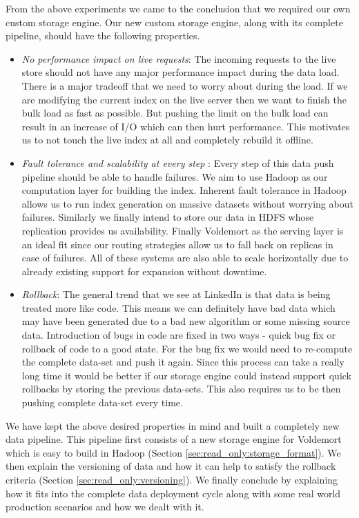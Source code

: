 \documentclass[10pt,twocolumn,preprint,natbib,authoryear]{sigplanconf}
\begin{document}
From the above experiments we came to the conclusion that we required our own custom storage engine. Our new custom storage engine, along with its complete pipeline, should have the following properties. 
\begin{itemize}
\item \emph {No performance impact on live requests}: The incoming requests to the live store should not have any major performance impact during the data load. There is a major tradeoff that we need to worry about during the load. If we are modifying the current index on the live server then we want to finish the bulk load as fast as possible. But pushing the limit on the bulk load can result in an increase of I/O which can then hurt performance. This motivates us to not touch the live index at all and completely rebuild it offline. 
\item \emph {Fault tolerance and scalability at every step }: Every step of this data push pipeline should be able to handle failures. We aim to use Hadoop as our computation layer for building the index. Inherent fault tolerance in Hadoop allows us to run index generation on massive datasets without worrying about failures. Similarly we finally intend to store our data in HDFS whose replication provides us availability. Finally Voldemort as the serving layer is an ideal fit since our routing strategies allow us to fall back on replicas in case of failures. All of these systems are also able to scale horizontally due to already existing support for expansion without downtime. 
\item \emph{Rollback}: The general trend that we see at LinkedIn is that data is being treated more like code. This means we can definitely have bad data which may have been generated due to a bad new algorithm or some missing source data. Introduction of bugs in code are fixed in two ways - quick bug fix or rollback of code to a good state. For the bug fix we would need to re-compute the complete data-set and push it again. Since this process can take a really long time it would be better if our storage engine could instead support quick rollbacks by storing the previous data-sets. This also requires us to be then pushing complete data-set every time. 
\end{itemize}

We have kept the above desired properties in mind and built a completely new data pipeline. This pipeline first consists of a new storage engine for Voldemort which is easy to build in Hadoop (Section \ref{sec:read_only:storage_format}). We then explain the versioning of data and how it can help to satisfy the rollback criteria (Section \ref{sec:read_only:versioning}). We finally conclude by explaining how it fits into the complete data deployment cycle along with some real world production scenarios and how we dealt with it. 
\end{document}
